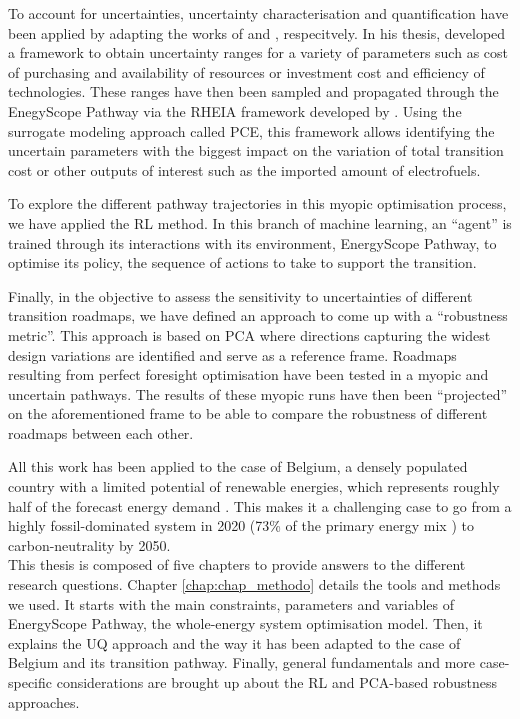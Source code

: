 To account for uncertainties, uncertainty characterisation and quantification have been applied by adapting the works of \citet{Moret2017PhDThesis} and \citet{coppittersthesis}, respecitvely. In his thesis, \citet{Moret2017PhDThesis} developed a framework to obtain uncertainty ranges for a variety of parameters such as cost of purchasing and availability of resources or investment cost and efficiency of technologies. These ranges have then been sampled and propagated through the EnegyScope Pathway via the RHEIA framework developed by \citet{coppittersthesis}. Using the surrogate modeling approach called \gls{PCE}, this framework allows identifying the uncertain parameters with the biggest impact on the variation of total transition cost or other outputs of interest such as the imported amount of electrofuels. 

To explore the different pathway trajectories in this myopic optimisation process, we have applied the \acrfull{RL} method. In this branch of machine learning, an ``agent'' is trained through its interactions with its environment, EnergyScope Pathway, to optimise its policy, \ie the sequence of actions to take to support the transition. 

Finally, in the objective to assess the sensitivity to uncertainties of different transition roadmaps, we have defined an approach to come up with a ``robustness metric''. This approach is based on \gls{PCA} where directions capturing the widest design variations are identified and serve as a reference frame. Roadmaps resulting from perfect foresight optimisation have been tested in a myopic and uncertain pathways. The results of these myopic runs have then been ``projected'' on the aforementioned frame to be able to compare the robustness of different roadmaps between each other.

All this work has been applied to the case of Belgium, a densely populated country with a limited potential of renewable energies, which represents roughly half of the forecast energy demand \cite{Limpens2020}. This makes it a challenging case to go from a highly fossil-dominated system in 2020 (73\% of the primary energy mix \cite{spf_economy_2022}) to carbon-neutrality by 2050.\\

\noindent
This thesis is composed of five chapters to provide answers to the different research questions. Chapter \ref{chap:chap_methodo} details the tools and methods we used. It starts with the main constraints, parameters and variables of EnergyScope Pathway, the whole-energy system optimisation model. Then, it explains the \acrfull{UQ} approach and the way it has been adapted to the case of Belgium and its transition pathway. Finally, general fundamentals and more case-specific considerations are brought up about the \gls{RL} and \gls{PCA}-based robustness approaches.

